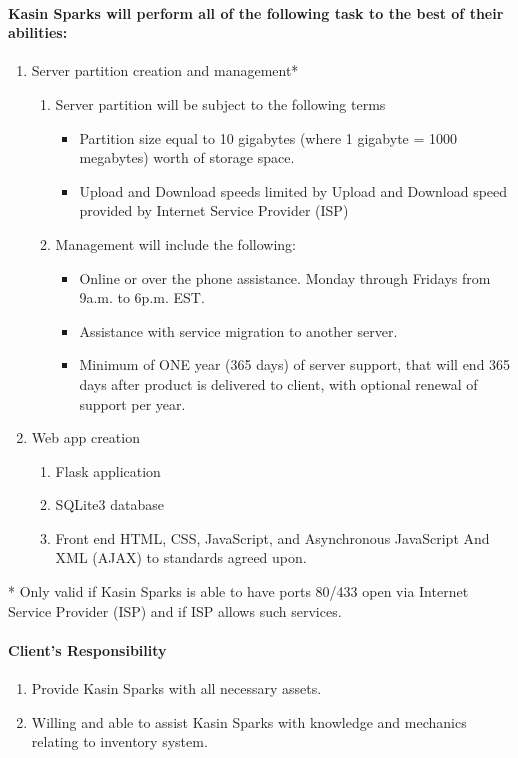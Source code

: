 \documentclass[12pt,letterpaper]{article}
\begin{document}
			\paragraph{\indent Kasin Sparks will perform all of the following task to the best of their abilities:}
			\begin{enumerate}
				\item Server partition creation and management*
				\begin{enumerate}
					\item Server partition will be subject to the following terms
					\begin{itemize}
					\item Partition size equal to 10 gigabytes (where 1 gigabyte = 1000 megabytes) worth of storage space. 
					\item Upload and Download speeds limited by Upload and Download speed provided by Internet Service Provider (ISP) 
					\end{itemize}
					\item Management will include the following:
					\begin{itemize}
						\item Online or over the phone assistance. Monday through Fridays from 9a.m. to 6p.m. EST.
						\item Assistance with service migration to another server. 
						\item Minimum of ONE year (365 days) of server support, that will end 365 days after product is delivered to client, with optional renewal of support per year.
					\end{itemize}
				\end{enumerate} 
				\item Web app creation
					\begin{enumerate}
						\item Flask application
						\item SQLite3 database
						\item Front end HTML, CSS, JavaScript, and Asynchronous JavaScript And XML (AJAX) to standards agreed upon.			
					\end{enumerate}
			\end{enumerate} 
			* Only valid if Kasin Sparks is able to have ports 80/433 open via Internet Service Provider (ISP) and if ISP allows such services.\\
			\paragraph{\indent Client's Responsibility}
			\begin{enumerate}
				\item Provide Kasin Sparks with all necessary assets.
				\item Willing and able to assist Kasin Sparks with knowledge and mechanics relating to inventory system.	
			\end{enumerate}
\end{document}
